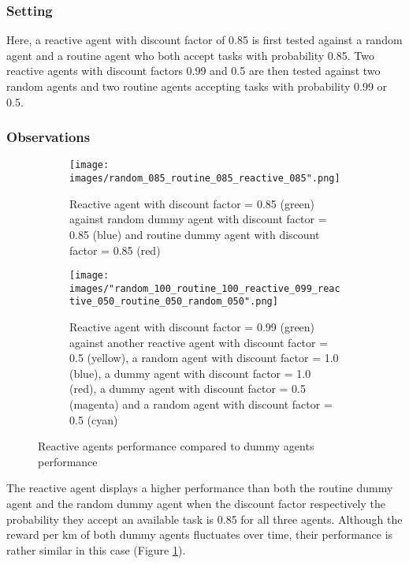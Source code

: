 \documentclass[10pt]{article}
\begin{document}
\subsubsection{Setting}
Here, a reactive agent with discount factor of 0.85 is first tested against a random agent and a routine agent who both accept tasks with probability 0.85.
Two reactive agents with discount factors 0.99 and 0.5 are then tested against two random agents and two routine agents accepting tasks with probability 0.99 or 0.5.

\subsubsection{Observations}

\begin{figure}[h!]
\centering
\begin{subfigure}[t]{0.47\textwidth}
\captionsetup{width=1.0\textwidth}
\texttt{[image: images/random\_085\_routine\_085\_reactive\_085".png]}
\caption{Reactive agent with discount factor = 0.85 (green) against random dummy agent with discount factor = 0.85 (blue) and routine dummy agent with discount factor = 0.85 (red)}
\label{reactive vs dummies a}
\end{subfigure}
\hfill
\begin{subfigure}[t]{0.47\textwidth}
\captionsetup{width=1.0\textwidth}
\texttt{[image: images/"random\_100\_routine\_100\_reactive\_099\_reactive\_050\_routine\_050\_random\_050".png]}
\caption{Reactive agent with discount factor = 0.99 (green) against another reactive agent with discount factor = 0.5 (yellow), 
a random agent with discount factor = 1.0 (blue),
a dummy agent with discount factor = 1.0 (red),
a dummy agent with discount factor = 0.5 (magenta) and 
a random agent with discount factor = 0.5 (cyan)}
\label{reactive vs dummies b}
\end{subfigure}
\caption{Reactive agents performance compared to dummy agents performance}
\label{reactive vs dummies}
\end{figure}

\noindent
The reactive agent displays a higher performance than both the routine dummy agent and the random dummy agent when the discount factor respectively the probability they accept an available task is 0.85 for all three agents.
Although the reward per km of both dummy agents fluctuates over time, their performance is rather similar in this case (Figure \ref{reactive vs dummies a}).
\end{document}
